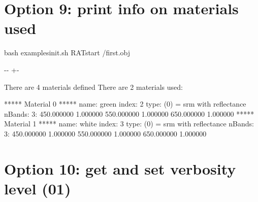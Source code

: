 \documentclass[letterpaper,10pt,english]{sphinxmanual}
\newlength\nbsphinxcodecellspacing
\begin{document}
\section{Option 9: print info on materials used}
\label{\detokenize{RATstartOptions:Option-9:-print-info-on-materials-used}}
\begin{sphinxVerbatim}[commandchars=\\\{\}]
                        
\end{sphinxVerbatim}

{
\begin{sphinxVerbatim}[commandchars=\\\{\}]
\llap{\color{nbsphinxin}[14]:\,\hspace{\fboxrule}\hspace{\fboxsep}}\PYGZpc{}\PYGZpc{}bash
 examples\PYGZus{}init.sh
RATstart /first.obj  
\end{sphinxVerbatim}
}

{

\kern-\sphinxverbatimsmallskipamount\kern-\baselineskip
\kern+\FrameHeightAdjust\kern-\fboxrule
\vspace{\nbsphinxcodecellspacing}

\begin{sphinxVerbatim}[commandchars=\\\{\}]
There are 4 materials defined
There are 2 materials used:

***** Material 0 *****
        name: green     index: 2
        type: (0) = srm with reflectance
        nBands: 3:
450.000000 1.000000
550.000000 1.000000
650.000000 1.000000
***** Material 1 *****
        name: white     index: 3
        type: (0) = srm with reflectance
        nBands: 3:
450.000000 1.000000
550.000000 1.000000
650.000000 1.000000
\end{sphinxVerbatim}
}


\section{Option 10: get and set verbosity level (0\sphinxhyphen{}1)}
\label{\detokenize{RATstartOptions:Option-10:-get-and-set-verbosity-level-(0-1)}}
\begin{sphinxVerbatim}[commandchars=\\\{\}]
                        
\end{sphinxVerbatim}
\end{document}
